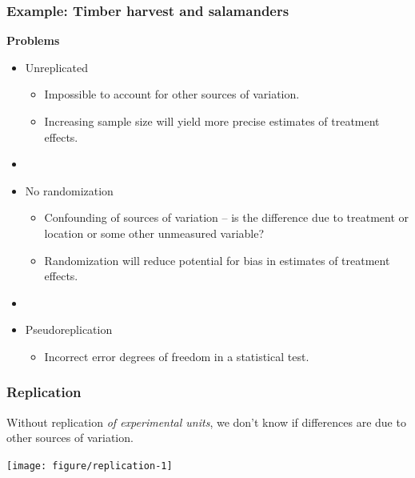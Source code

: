 \documentclass[color=usenames,dvipsnames]{beamer}\usepackage[]{graphicx}\usepackage[]{xcolor}
\newenvironment{knitrout}{}{} %
\begin{document}
\begin{frame}
  \frametitle{Example: Timber harvest and salamanders}
  {\bf Problems}
  \begin{itemize}
    \item Unreplicated
      \begin{itemize}
      \item Impossible to account for other sources of variation.
      \item Increasing sample size will yield more precise estimates
        of treatment effects.
        \end{itemize}
    \item[]
    \item<2-> No randomization
      \begin{itemize}
        \item Confounding of sources of variation -- is the difference
          due to treatment or location or some other unmeasured variable? 
        \item Randomization will reduce potential for bias in
          estimates of treatment effects.
      \end{itemize}      
    \item[]
    \item<3-> Pseudoreplication
      \begin{itemize}
      \item Incorrect error degrees of freedom in a statistical test.
      \end{itemize}
    \end{itemize}
\end{frame}


\begin{frame}[fragile]
  \frametitle{Replication}
  Without replication {\it of experimental units}, we don't know if
  differences are due to other sources of variation. \\
  \vfill
\begin{knitrout}\scriptsize
{}\color{fgcolor}

{\centering \texttt{[image: figure/replication-1]} 

}


\end{knitrout}
\end{frame}
\end{document}
